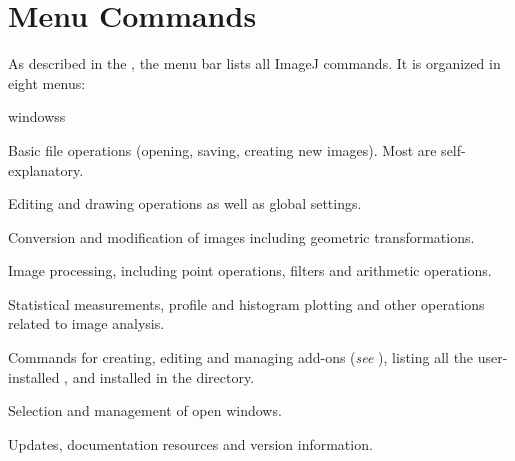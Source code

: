 
\part{Menu Commands\label{par:Commands}}

As described in the , the menu bar lists
all ImageJ commands. It is organized in eight menus:
\begin{lyxlist}{windowss}
\item [{\userinterface{\noindent \nameref{sec:File}}}] \noindent Basic
file operations (opening, saving, creating new images). Most are self-explanatory.
\item [{\userinterface{\noindent \nameref{sec:Edit}}}] \noindent Editing
and drawing operations as well as global settings.
\item [{\userinterface{\noindent \nameref{sec:Image}}}] \noindent Conversion
and modification of images including geometric transformations.
\item [{\userinterface{\noindent \nameref{sec:Process}}}] \noindent Image
processing, including point operations, filters and arithmetic operations.
\item [{\userinterface{\noindent \nameref{sec:Analyze-Menu}}}] \noindent Statistical
measurements, profile and histogram plotting and other operations
related to image analysis.
\item [{\userinterface{\noindent \nameref{sec:Plugins}}}] \noindent Commands
for creating, editing and managing add-ons (\emph{see} ),
listing all the user-installed ,
 and  installed in the
 directory.
\item [{\userinterface{\noindent \nameref{sec:WindowMenu}}}] \noindent Selection
and management of open windows.
\item [{\userinterface{\noindent \nameref{sec:Help}}}] \noindent Updates,
documentation resources and version information.
\end{lyxlist}
